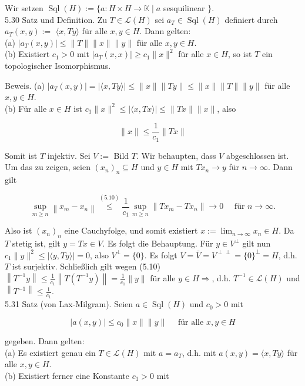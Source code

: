 \documentclass[10pt, letterpaper]{article}
\begin{document}
Wir setzen $\operatorname{Sql}(H):=\{a: H \times H \rightarrow \mathbb{K} \mid a$ sesquilinear $\}$.\\
5.30 Satz und Definition. Zu $T \in \mathcal{L}(H)$ sei $a_{T} \in \operatorname{Sql}(H)$ definiert durch $a_{T}(x, y):=$ $\langle x, T y\rangle$ für alle $x, y \in H$. Dann gelten:\\
(a) $\left|a_{T}(x, y)\right| \leq\|T\|\|x\|\|y\|$ für alle $x, y \in H$.\\
(b) Existiert $c_{1}>0$ mit $\left|a_{T}(x, x)\right| \geq c_{1}\|x\|^{2}$ für alle $x \in H$, so ist $T$ ein topologischer Isomorphismus.

Beweis. (a) $\left|a_{T}(x, y)\right|=|\langle x, T y\rangle| \leq\|x\|\|T y\| \leq\|x\|\|T\|\|y\|$ für alle $x, y \in H$.\\
(b) Für alle $x \in H$ ist $c_{1}\|x\|^{2} \leq|\langle x, T x\rangle| \leq\|T x\|\|x\|$, also

$$
\|x\| \leq \frac{1}{c_{1}}\|T x\|
$$

Somit ist $T$ injektiv. Sei $V:=$ Bild $T$. Wir behaupten, dass $V$ abgeschlossen ist. Um das zu zeigen, seien $\left(x_{n}\right)_{n} \subseteq H$ und $y \in H$ mit $T x_{n} \rightarrow y$ für $n \rightarrow \infty$. Dann gilt

$$
\sup _{m \geq n}\left\|x_{m}-x_{n}\right\| \stackrel{(5.10)}{\leq} \frac{1}{c_{1}} \sup _{m \geq n}\left\|T x_{m}-T x_{n}\right\| \rightarrow 0 \quad \text { für } n \rightarrow \infty .
$$

Also ist $\left(x_{n}\right)_{n}$ eine Cauchyfolge, und somit existiert $x:=\lim _{n \rightarrow \infty} x_{n} \in H$. Da $T$ stetig ist, gilt $y=T x \in V$. Es folgt die Behauptung. Für $y \in V^{\perp}$ gilt nun $c_{1}\|y\|^{2} \leq|\langle y, T y\rangle|=0$, also $V^{\perp}=\{0\}$. Es folgt $V=\bar{V}=V^{\perp \perp}=\{0\}^{\perp}=H$, d.h. $T$ ist surjektiv. Schließlich gilt wegen (5.10) $\left\|T^{-1} y\right\| \leq \frac{1}{c_{1}}\left\|T\left(T^{-1} y\right)\right\|=\frac{1}{c_{1}}\|y\|$ für alle $y \in H \Longrightarrow$, d.h. $T^{-1} \in \mathcal{L}(H)$ und $\left\|T^{-1}\right\| \leq \frac{1}{c_{1}}$.\\
5.31 Satz (von Lax-Milgram). Seien $a \in \operatorname{Sql}(H)$ und $c_{0}>0$ mit

$$
|a(x, y)| \leq c_{0}\|x\|\|y\| \quad \text { für alle } x, y \in H
$$

gegeben. Dann gelten:\\
(a) Es existiert genau ein $T \in \mathcal{L}(H)$ mit $a=a_{T}$, d.h. mit $a(x, y)=\langle x, T y\rangle$ für alle $x, y \in H$.\\
(b) Existiert ferner eine Konstante $c_{1}>0$ mit
\end{document}
